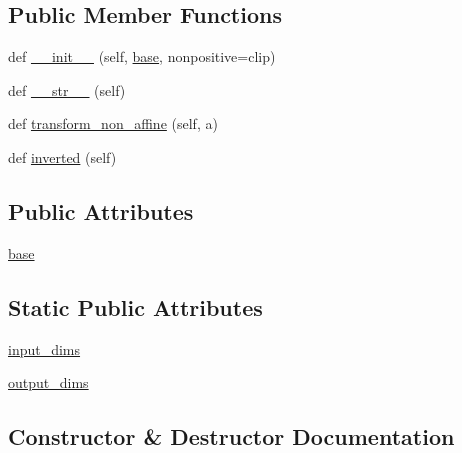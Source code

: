 \subsection*{Public Member Functions}
\begin{DoxyCompactItemize}
\item 
def \hyperlink{classmatplotlib_1_1scale_1_1LogTransform_a9d54155a7b0564e3bc6c92c3e8f7ce20}{\+\_\+\+\_\+init\+\_\+\+\_\+} (self, \hyperlink{classmatplotlib_1_1scale_1_1LogTransform_a794cb5b75245f78ae8f607ff41995909}{base}, nonpositive=\textquotesingle{}clip\textquotesingle{})
\item 
def \hyperlink{classmatplotlib_1_1scale_1_1LogTransform_ae9fbce61c63d2cf2733b2638a12b0ae6}{\+\_\+\+\_\+str\+\_\+\+\_\+} (self)
\item 
def \hyperlink{classmatplotlib_1_1scale_1_1LogTransform_aa59c288034c9cc0503fbba49e3e1a9f9}{transform\+\_\+non\+\_\+affine} (self, a)
\item 
def \hyperlink{classmatplotlib_1_1scale_1_1LogTransform_afc19b48694f533f15788d469689bae66}{inverted} (self)
\end{DoxyCompactItemize}
\subsection*{Public Attributes}
\begin{DoxyCompactItemize}
\item 
\hyperlink{classmatplotlib_1_1scale_1_1LogTransform_a794cb5b75245f78ae8f607ff41995909}{base}
\end{DoxyCompactItemize}
\subsection*{Static Public Attributes}
\begin{DoxyCompactItemize}
\item 
\hyperlink{classmatplotlib_1_1scale_1_1LogTransform_a51379a2e09f21caf0829c295dd3138e1}{input\+\_\+dims}
\item 
\hyperlink{classmatplotlib_1_1scale_1_1LogTransform_ac32c0aa1ac530200daeef3342291fe9a}{output\+\_\+dims}
\end{DoxyCompactItemize}


\subsection{Constructor \& Destructor Documentation}
\mbox{\label{classmatplotlib_1_1scale_1_1LogTransform_a9d54155a7b0564e3bc6c92c3e8f7ce20}} 
